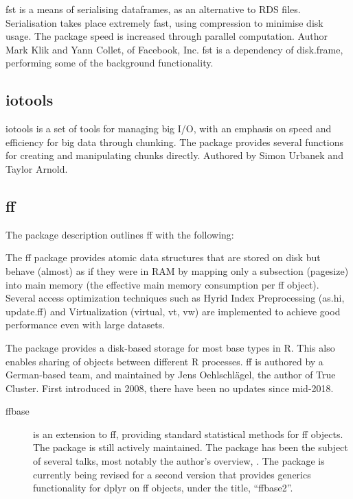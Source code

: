 fst is a means of serialising dataframes, as an alternative to RDS
files\cite{klik19}. Serialisation takes place extremely fast, using
compression to minimise disk usage. The package speed is increased
through parallel computation. Author Mark Klik and Yann Collet, of
Facebook, Inc. fst is a dependency of disk.frame, performing some of the
background functionality.

\hypertarget{sec:iotools}{%
    \subsection{iotools}\label{sec:iotools}}

iotools is a set of tools for managing big I/O, with an emphasis on
speed and efficiency for big data through chunking\cite{urbanek20b}. The
package provides several functions for creating and manipulating chunks
directly. Authored by Simon Urbanek and Taylor Arnold.

\hypertarget{sec:ff}{%
    \subsection{ff}\label{sec:ff}}

The package description outlines ff with the following:

\begin{displayquote}
    The ff package provides atomic data structures that are stored on disk
    but behave (almost) as if they were in RAM by mapping only a subsection
    (pagesize) into main memory (the effective main memory consumption per
    ff object). Several access optimization techniques such as Hyrid Index
    Preprocessing (as.hi, update.ff) and Virtualization (virtual, vt, vw)
    are implemented to achieve good performance even with large datasets.
\end{displayquote}

The package provides a disk-based storage for most base types in R. This
also enables sharing of objects between different R processes. ff is
authored by a German-based team, and maintained by Jens Oehlschlägel,
the author of True Cluster. First introduced in
2008\cite{adler08:_large_r}, there have been no updates since
mid-2018.

\begin{description}

    \item[ffbase\cite{jonge20}]
        is an extension to ff, providing standard statistical methods for ff
        objects. The package is still actively maintained. The package has been
        the subject of several talks, most notably the author's overview,
        \cite{wijffels13}. The package is currently being revised for a second
        version that provides generics functionality for dplyr on ff objects,
        under the title, ``ffbase2''\cite{jonge15}.
\end{description}